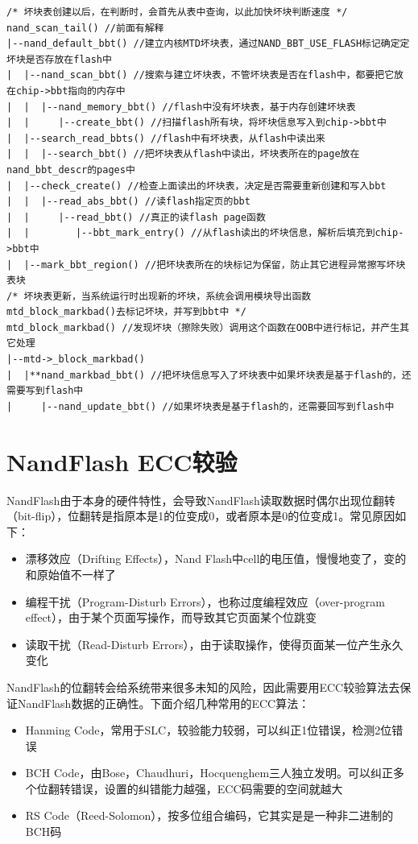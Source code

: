 \begin{mdframed}[style=leftredline]
\begin{verbatim}
/* 坏块表创建以后，在判断时，会首先从表中查询，以此加快坏块判断速度 */
nand_scan_tail() //前面有解释
|--nand_default_bbt() //建立内核MTD坏块表，通过NAND_BBT_USE_FLASH标记确定定坏块是否存放在flash中
|  |--nand_scan_bbt() //搜索与建立坏块表，不管坏块表是否在flash中，都要把它放在chip->bbt指向的内存中
|  |  |--nand_memory_bbt() //flash中没有坏块表，基于内存创建坏块表
|  |     |--create_bbt() //扫描flash所有块，将坏块信息写入到chip->bbt中
|  |--search_read_bbts() //flash中有坏块表，从flash中读出来
|  |  |--search_bbt() //把坏块表从flash中读出，坏块表所在的page放在nand_bbt_descr的pages中
|  |--check_create() //检查上面读出的坏块表，决定是否需要重新创建和写入bbt
|  |  |--read_abs_bbt() //读flash指定页的bbt
|  |     |--read_bbt() //真正的读flash page函数
|  |        |--bbt_mark_entry() //从flash读出的坏块信息，解析后填充到chip->bbt中
|  |--mark_bbt_region() //把坏块表所在的块标记为保留，防止其它进程异常擦写坏块表块
/* 坏块表更新，当系统运行时出现新的坏块，系统会调用模块导出函数mtd_block_markbad()去标记坏块，并写到bbt中 */
mtd_block_markbad() //发现坏块（擦除失败）调用这个函数在OOB中进行标记，并产生其它处理
|--mtd->_block_markbad()
|  |**nand_markbad_bbt() //把坏块信息写入了坏块表中如果坏块表是基于flash的，还需要写到flash中
|     |--nand_update_bbt() //如果坏块表是基于flash的，还需要回写到flash中
\end{verbatim}
\end{mdframed}

\clearpage
\section{NandFlash ECC较验}
NandFlash由于本身的硬件特性，会导致NandFlash读取数据时偶尔出现位翻转（bit-flip），位翻转是指原本是1的位变成0，或者原本是0的位变成1。常见原因如下：
\begin{itemize}
  \item 漂移效应（Drifting Effects），Nand Flash中cell的电压值，慢慢地变了，变的和原始值不一样了
  \item 编程干扰（Program-Disturb Errors），也称过度编程效应（over-program effect），由于某个页面写操作，而导致其它页面某个位跳变
  \item 读取干扰（Read-Disturb Errors），由于读取操作，使得页面某一位产生永久变化
\end{itemize}

NandFlash的位翻转会给系统带来很多未知的风险，因此需要用ECC较验算法去保证NandFlash数据的正确性。下面介绍几种常用的ECC算法：
\begin{itemize}
  \item Hanming Code，常用于SLC，较验能力较弱，可以纠正1位错误，检测2位错误
  \item BCH Code，由Bose，Chaudhuri，Hocquenghem三人独立发明。可以纠正多个位翻转错误，设置的纠错能力越强，ECC码需要的空间就越大
  \item RS Code（Reed-Solomon），按多位组合编码，它其实是是一种非二进制的BCH码
\end{itemize}
